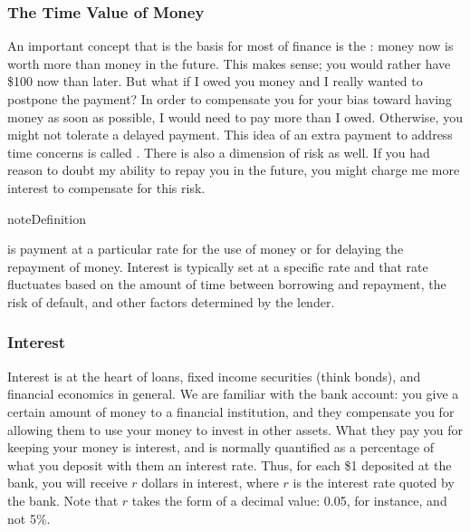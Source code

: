 \documentclass[letterpaper,10pt,english]{jupyterBook}
\begin{document}
\subsubsection{The Time Value of Money}
\label{\detokenize{content/10-finance/value-interest:the-time-value-of-money}}
\sphinxAtStartPar
An important concept that is the basis for most of finance is the : money now is worth more than money in the future. This makes sense; you would rather have \$100 now than later. But what if I owed you money and I really wanted to postpone the payment? In order to compensate you for your bias toward having money as soon as possible, I would need to pay more than I owed. Otherwise, you might not tolerate a delayed payment. This idea of an extra payment to address time concerns is called . There is also a dimension of risk as well. If you had reason to doubt my ability to repay you in the future, you might charge me more interest to compensate for this risk.

\begin{sphinxadmonition}{note}{Definition}

\sphinxAtStartPar
{} is payment at a particular rate for the use of money or for delaying the repayment of money. Interest is typically set at a specific rate and that rate fluctuates based on the amount of time between borrowing and repayment, the risk of default, and other factors determined by the lender.
\end{sphinxadmonition}


\subsubsection{Interest}
\label{\detokenize{content/10-finance/value-interest:interest}}
\sphinxAtStartPar
Interest is at the heart of loans, fixed income securities (think bonds), and financial economics in general. We are familiar with the bank account: you give a certain amount of money to a financial institution, and they compensate you for allowing them to use your money to invest in other assets. What they pay you for keeping your money is interest, and is normally quantified as a percentage of what you deposit with them \sphinxhyphen{} an interest rate. Thus, for each \$1 deposited at the bank, you will receive \(r\) dollars in interest, where \(r\) is the interest rate quoted by the bank. Note that \(r\) takes the form of a decimal value: 0.05, for instance, and not 5\%.
\end{document}
